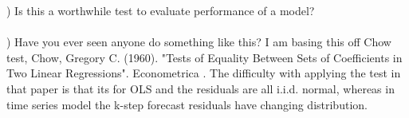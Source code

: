 \documentclass[11pt]{amsart}
\begin{document}
) Is this a worthwhile test to evaluate performance of a model?\\ \\

) Have you ever seen anyone do something like this? I am basing this off Chow test, Chow, Gregory C. (1960). "Tests of Equality Between Sets of Coefficients in Two Linear Regressions". Econometrica . The difficulty with applying the test in that paper is that its for OLS and the residuals are all i.i.d. normal, whereas in time series model the k-step forecast residuals have changing distribution. \\ \\
\end{document}
